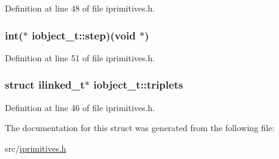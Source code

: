 Definition at line 48 of file iprimitives.\-h.

\hypertarget{structiobject__t_ae36734213d8eb5491df4b99193307450}{
\subsubsection[{step}]{\setlength{\rightskip}{0pt plus 5cm}int($\ast$ iobject\-\_\-t\-::step)(void $\ast$)}}\label{structiobject__t_ae36734213d8eb5491df4b99193307450}


Definition at line 51 of file iprimitives.\-h.

\hypertarget{structiobject__t_ae5c7b9d49120fc7003f01fcf7055b425}{
\subsubsection[{triplets}]{\setlength{\rightskip}{0pt plus 5cm}struct {\bf ilinked\-\_\-t}$\ast$ iobject\-\_\-t\-::triplets}}\label{structiobject__t_ae5c7b9d49120fc7003f01fcf7055b425}


Definition at line 46 of file iprimitives.\-h.



The documentation for this struct was generated from the following file\-:\begin{DoxyCompactItemize}
\item 
src/\hyperlink{iprimitives_8h}{iprimitives.\-h}\end{DoxyCompactItemize}
